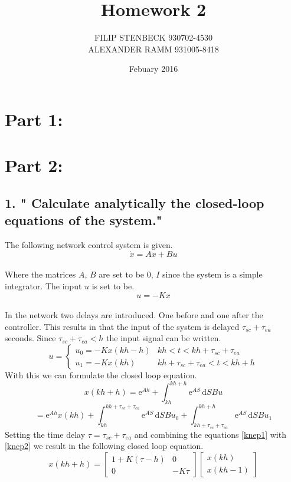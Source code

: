 \documentclass[10pt,a4paper]{article}
\author{FILIP STENBECK	930702-4530 \\ ALEXANDER RAMM 931005-8418}
\date{Febuary 2016}
\title{Homework 2}
\begin{document}
\maketitle
\clearpage
\section*{Part 1:}
\section*{Part 2:}
\subsection*{1. " Calculate analytically the closed-loop equations of the system."}
The following network control system is given. 
\begin{equation}
\dot{x}=Ax+Bu
\end{equation}\\ Where the matrices $A$, $B$ are set to be $0$, $I$ since the system is a simple integrator. The input $u$ is set to be. \\
\begin{equation*}
u=-Kx
\end{equation*}\\
In the network two delays are introduced. One before and one after the controller. This results in that the input of the system is delayed $\tau_{sc}+\tau_{ea}$ seconds. Since $\tau_{sc}+\tau_{ea}<h$ the input signal can be written.\\
\begin{equation}\label{knep1}
u=
\begin{cases}
u_0=-Kx(kh-h)&kh<t<kh+\tau_{sc}+\tau_{ea}\\
u_1=-Kx(kh)&kh+\tau_{sc}+\tau_{ea}<t<kh+h
\end{cases}
\end{equation}
With this we can formulate the closed loop equation.
\begin{equation*}
x(kh+h)=\mathrm{e}^{Ah}+\int_{kh}^{kh+h} \mathrm{e}^{AS}\,\mathrm{d}S Bu
\end{equation*}
\begin{equation}\label{knep2}
=\mathrm{e}^{Ah}x(kh)+\int_{kh}^{kh+\tau_{sc}+\tau_{ea}} \mathrm{e}^{AS}\,\mathrm{d}S Bu_0+\int_{kh+\tau_{sc}+\tau_{ea}}^{kh+h} \mathrm{e}^{AS}\,\mathrm{d}S Bu_1
\end{equation}
Setting the time delay $\tau=\tau_{sc}+\tau_{ea}$ and combining the equations \ref{knep1} with \ref{knep2} we result in the following closed loop equation.
\begin{equation*}
x(kh+h)=\begin{bmatrix}
1+K(\tau-h)&0\\
0&-K\tau
\end{bmatrix}
\begin{bmatrix}
x(kh)\\
x(kh-1)
\end{bmatrix}
\end{equation*}
\end{document}
